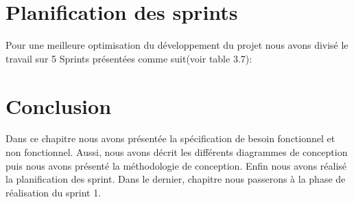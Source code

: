 \section{\LARGE Planification des sprints}
\textsf{\selectfont{} 
Pour une meilleure optimisation  du développement du projet nous avons divisé le travail sur 5 Sprints présentées comme suit(voir table 3.7):
}
\begin{center}
  \begin{table}[H]  
    \centering
 \caption{Planification des sprints}
 \end{table}
 \end{center} 
 \section{\LARGE Conclusion}
 \textsf{\selectfont{} Dans ce chapitre nous avons présentée la spécification de besoin fonctionnel et non fonctionnel. Aussi, nous avons décrit les différents diagrammes de conception puis nous avons présenté la méthodologie de conception. Enfin nous avons réalisé la planification des sprint. Dans le dernier, chapitre 
 nous passerons à la phase de réalisation du sprint 1.
}


